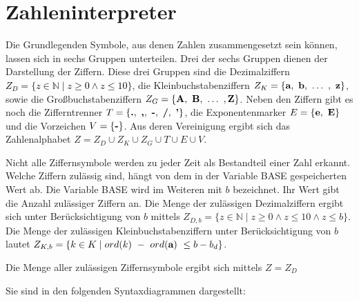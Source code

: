 \documentclass[a4paper, DIV=18, parskip=half]{scrartcl}
\newcommand{\letter}[1]{\textbf{\textcolor{black}{#1}}}
\newcommand{\mymath}[1]{\textcolor{black}{$#1$}}
\begin{document}

\section{Zahleninterpreter}
Die Grundlegenden Symbole, aus denen Zahlen zusammengesetzt sein können, lassen sich in sechs Gruppen unterteilen. Drei der sechs Gruppen dienen der Darstellung der Ziffern. Diese drei Gruppen sind die Dezimalziffern \mymath{Z_D = \lbrace{ z \in \mathbb{N} \mid z \geq 0 \wedge z \le 10 \rbrace}}, die Kleinbuchstabenziffern \mymath{Z_K = \lbrace{ \letter{a},\ \letter{b},\ \ldots\ ,\ \letter{z} \rbrace}}, sowie die Großbuchstabenziffern \mymath{Z_G = \lbrace{\letter{A},\ \letter{B},\ \ldots\ ,\letter{Z}\rbrace}}. Neben den Ziffern gibt es noch die Zifferntrenner \mymath{T = \lbrace{ \letter{.},\ \letter{,},\ \letter{-},\ \letter{/},\ \letter{'}\rbrace}}, die Exponentenmarker \mymath{E = \lbrace{ \letter{e},\ \letter{E} \rbrace}} und die Vorzeichen $V = \{\letter{-}\}$. Aus deren Vereinigung ergibt sich das Zahlenalphabet $Z = Z_D \cup Z_K \cup Z_G \cup T \cup E \cup V$.

Nicht alle Ziffernsymbole werden zu jeder Zeit als Bestandteil einer Zahl erkannt. Welche Ziffern zulässig sind, hängt von dem in der Variable BASE gespeicherten Wert ab. Die Variable BASE wird im Weiteren mit $b$ bezeichnet. Ihr Wert gibt die Anzahl zulässiger Ziffern an. Die Menge der zulässigen Dezimalziffern ergibt sich unter Berücksichtigung von $b$ mittels $Z_{D,b} = \{ z \in \mathbb{N} \mid z \geq 0 \wedge z \le 10 \wedge z \le b \}$. Die Menge der zulässigen Kleinbuchstabenziffern unter Berücksichtigung von $b$ lautet $Z_{K,b} = \{ k \in K \mid ord(k)\ -\ ord(\letter{a})\ \le b - b_d \}$.

Die Menge aller zulässigen Ziffernsymbole ergibt sich mittels $Z = Z_D$

Sie sind in den folgenden Syntaxdiagrammen dargestellt:

\begin{minipage}{\linewidth}
\centering
{}
\end{minipage}
\end{document}

